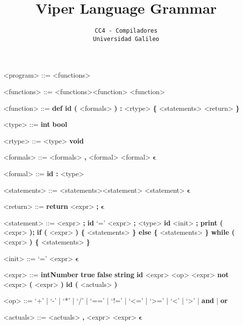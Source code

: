 \documentclass[12pt]{report}
\title{\textbf{Viper Language Grammar}}
\author{\texttt{CC4 - Compiladores} \\ \texttt{Universidad Galileo}}
\date{}
\begin{document}
\maketitle
\setlength{\grammarindent}{9em}
\begin{grammar}
<program> ::= <functions>

<functions> ::= <functions><function>
\alt <function>

<function> ::= \textbf{def id (} <formals> \textbf{) :} <rtype> \textbf{\{} <statements> <return> \textbf{\}}

<type> ::= \textbf{int}
\alt \textbf{bool}

<rtype> ::= <type>
\alt \textbf{void}

<formals> ::= <formals> \textbf{,} <formal>
\alt <formal>
\alt $\bm{\epsilon}$

<formal> ::= \textbf{id :} <type>

<statements> ::= <statements><statement>
\alt <statement>
\alt $\bm{\epsilon}$

<return> ::= \textbf{return} <expr> \textbf{;}
\alt $\bm{\epsilon}$

<statement> ::= <expr> \textbf{;}
\alt \textbf{id} `=' <expr> \textbf{;}
\alt <type> \textbf{id} <init> \textbf{;}
\alt \textbf{print (} <expr> \textbf{);}
\alt \textbf{if (} <expr> \textbf{) \{} <statements> \textbf{\} else \{} <statements> \textbf{\}}
\alt \textbf{while (} <expr> \textbf{) \{} <statements> \textbf{\}}

<init> ::= `=' <expr>
\alt $\bm{\epsilon}$

<expr> ::= \textbf{intNumber}
\alt \textbf{true}
\alt \textbf{false}
\alt \textbf{string}
\alt \textbf{id}
\alt <expr> <op> <expr>
\alt \textbf{not} <expr>
\alt \textbf{(} <expr> \textbf{)}
\alt \textbf{id (} <actuals> \textbf{)}

<op> ::= `+' | `-' | `*' | `/' | `==' | `!=' | `<=' | `>=' | `<' | `>' | \textbf{and} | \textbf{or}

<actuals> ::= <actuals> \textbf{,} <expr>
\alt <expr>
\alt $\bm{\epsilon}$
\end{grammar}
\end{document}
